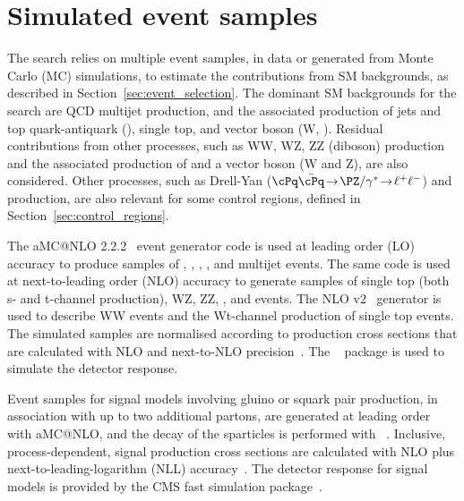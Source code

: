 \section{Simulated event samples}
\label{sec:simulation}

The search relies on multiple event samples, in data or generated from
Monte Carlo (MC) simulations, to estimate the contributions from SM
backgrounds, as described in Section~\ref{sec:event_selection}. 
The dominant SM backgrounds for the search are QCD multijet
production, and the associated production of jets and top
quark-antiquark (\ttbar), single top, and vector boson (W,
\znunu). Residual contributions from other processes, such as WW, WZ,
ZZ (diboson) production and the associated production of \ttbar and a
vector boson (W and Z), are also considered. Other processes, such as
Drell-Yan ($\cPq\bar{\cPq}\!  \rightarrow\! \PZ/\gamma^*\!
\rightarrow\!  \ell^+\ell^-$) and \gj production, are also relevant
for some control regions, defined in
Section~\ref{sec:control_regions}.

The  aMC@NLO 2.2.2~\cite{Alwall2014} event generator code is
used at leading order (LO) accuracy to produce samples of \wj, \zj,
\gj, \ttbar, and multijet events. The same code is used at
next-to-leading order (NLO) accuracy to generate samples of single top
(both s- and t-channel production), WZ, ZZ, \ttw, and \ttz events. The
NLO \POWHEG v2~\cite{powheg, powheg_top_Wt} generator is used to
describe WW events and the Wt-channel production of single top
events. The simulated samples are normalised according to production
cross sections that are calculated with NLO and next-to-NLO
precision~\cite{Alwall2014, wphys, fewz, wwxs, top++, nlotop,
  powheg_top_Wt}. The \GEANTfour~\cite{geant} package is used to
simulate the detector response. 

Event samples for signal models involving gluino or squark pair
production, in association with up to two additional partons, are
generated at leading order with  aMC@NLO, and the decay of
the sparticles is performed with ~\cite{pythia}. Inclusive,
process-dependent, signal production cross sections are calculated
with NLO plus next-to-leading-logarithm (NLL)
accuracy~\cite{Beenakker:1996ch, PhysRevLett.102.111802,
  PhysRevD.80.095004, 1126-6708-2009-12-041,
  doi:10.1142/S0217751X11053560, susynlo}. The detector response for
signal models is provided by the CMS fast simulation
package~\cite{fastsim}.

